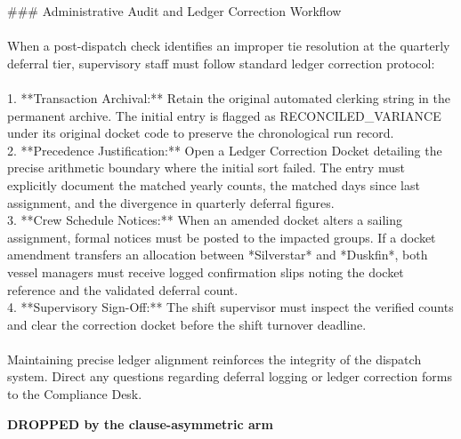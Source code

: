\documentclass[9pt]{article}
\begin{document}
\begin{minipage}[t]{\textwidth}
\begin{minipage}[t]{0.49\textwidth}
\begin{exbox}
{  \#\#\# Administrative Audit and Ledger Correction Workflow \\
  \  \\
  When a post-dispatch check identifies an improper tie resolution at the quarterly deferral tier, supervisory staff must follow standard ledger correction protocol: \\
  \  \\
  1. **Transaction Archival:** Retain the original automated clerking string in the permanent archive. The initial entry is flagged as \textasciigrave{}RECONCILED\_VARIANCE\textasciigrave{} under its original docket code to preserve the chronological run record. \\
  2. **Precedence Justification:** Open a Ledger Correction Docket detailing the precise arithmetic boundary where the initial sort failed. The entry must explicitly document the matched yearly counts, the matched days since last assignment, and the divergence in quarterly deferral figures. \\
  3. **Crew Schedule Notices:** When an amended docket alters a sailing assignment, formal notices must be posted to the impacted groups. If a docket amendment transfers an allocation between *Silverstar* and *Duskfin*, both vessel managers must receive logged confirmation slips noting the docket reference and the validated deferral count. \\
  4. **Supervisory Sign-Off:** The shift supervisor must inspect the verified counts and clear the correction docket before the shift turnover deadline. \\
  \  \\
  Maintaining precise ledger alignment reinforces the integrity of the dispatch system. Direct any questions regarding deferral logging or ledger correction forms to the Compliance Desk.}
\end{exbox}
\end{minipage}\hfill
\begin{minipage}[t]{0.49\textwidth}\fontsize{7.14}{7.85}\linespread{1}\selectfont
\textbf{DROPPED by the clause-asymmetric arm}\\[1pt]
\begin{exbox}

\end{exbox}
\end{minipage}
\end{minipage}
\end{document}
